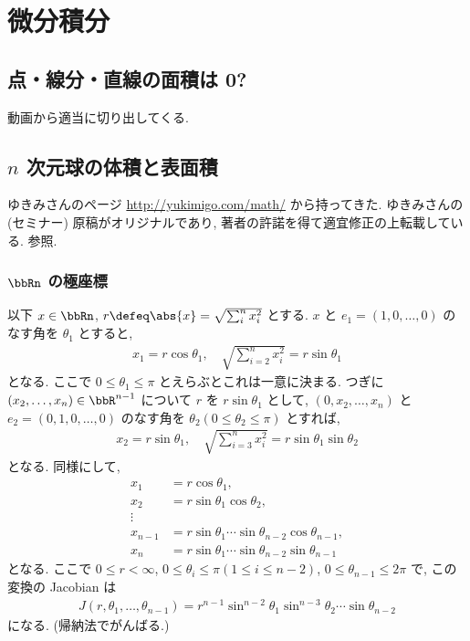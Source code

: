 \documentclass[openany, a4paper, oneside]{jsbook}
\begin{document}
\part{微分積分}

\chapter{点・線分・直線の面積は 0?}

動画から適当に切り出してくる.
\chapter{$n$ 次元球の体積と表面積\label{calculus-n-sphere-volume-surface-area0}}

ゆきみさんのページ \url{http://yukimigo.com/math/} から持ってきた.
ゆきみさんの (セミナー) 原稿がオリジナルであり, 著者の許諾を得て適宜修正の上転載している.
\cite{MitsuoSugiura1, MitsuoSugiura2} 参照.
\section{$\bbRn$ の極座標}

以下 $x \in \bbRn$, $r \defeq \abs{x} = \sqrt{\sum_i^n x_i^2}$ とする.
$x$ と $e_1 = (1, 0, \dots, 0)$ のなす角を $\theta_1$ とすると,
\begin{align}
 x_1
 =
 r \cos \theta_1, \quad
 \sqrt{\sum_{i=2}^n x_i^2}
 =
 r \sin \theta_1
\end{align}
となる.
ここで $0 \le \theta_1 \le \pi$ とえらぶとこれは一意に決まる.
つぎに $(x_2, \dots , x_n) \in \bbR^{n-1}$ について
$r$ を $r \sin \theta_1$ として, $(0, x_2, \dots, x_n)$ と
$e_2 = (0, 1, 0, \dots, 0)$ のなす角を $\theta_2 (0 \le \theta_2 \le \pi)$ とすれば,
\begin{align}
 x_2
 =
 r \sin \theta_1, \quad
 \sqrt{\sum_{i=3}^n x_i^2}
 =
 r\sin \theta_1 \sin \theta_2
\end{align}
となる.
同様にして,
\begin{align}
 x_1
 &=
 r\cos \theta_1, \\
 x_2
 &=
 r\sin \theta_1\cos \theta_2, \\
 \vdots \\
 x_{n-1}
 &=
 r\sin \theta_1 \cdots \sin \theta_{n-2} \cos \theta_{n-1}, \\
 x_n
 &=
 r\sin \theta_1 \cdots \sin \theta_{n-2} \sin \theta_{n-1}
\end{align}
となる.
ここで $0 \le r < \infty$,  $0 \le \theta_i \le \pi (1 \le i \le n-2)$,
$0 \le \theta_{n-1} \le 2\pi$ で, この変換の Jacobian は
\begin{align}
 J(r, \theta_1, \dots, \theta_{n-1})
 =
 r^{n-1} \sin^{n-2} \theta_1 \sin^{n-3}\theta_2 \cdots \sin \theta_{n-2}
\end{align}
になる. (帰納法でがんばる.)
\end{document}
